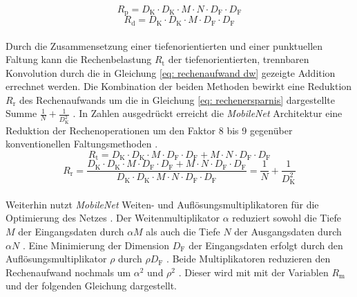 		\begin{equation}
			R_\text{p}=D_\text{K} \cdot D_\text{K} \cdot M \cdot N \cdot D_\text{F} \cdot D_\text{F}
			\label{eq: rechenaufwand}
		\end{equation}
		\begin{equation}
		R_\text{d}=D_\text{K} \cdot D_\text{K} \cdot M \cdot D_\text{F} \cdot D_\text{F}
		\label{eq: rechenaufwand t}
		\end{equation}\\
	
		Durch die Zusammensetzung einer tiefenorientierten und einer punktuellen Faltung kann die Rechenbelastung $R_\text{t}$ der tiefenorientierten, trennbaren Konvolution durch die in Gleichung \ref{eq: rechenaufwand dw} gezeigte Addition errechnet werden. Die Kombination der beiden Methoden bewirkt eine Reduktion $R_\text{r}$ des Rechenaufwands um die in Gleichung \ref{eq: rechenersparnis} dargestellte Summe $\frac{1}{N}+\frac{1}{D^2_\text{K}}$ \cite{mobilenets}. In Zahlen ausgedrückt erreicht die \textit{MobileNet} Architektur eine Reduktion der Rechenoperationen um den Faktor 8 bis 9 gegenüber konventionellen Faltungsmethoden \cite{mobilenets}.  \\
	
		\begin{equation}
			R_\text{t}=D_\text{K} \cdot D_\text{K} \cdot M \cdot D_\text{F} \cdot D_\text{F} + M \cdot N \cdot D_\text{F} \cdot D_\text{F}
			\label{eq: rechenaufwand dw}
		\end{equation}
		\begin{equation}
			R_\text{r}=\frac{D_\text{K} \cdot D_\text{K} \cdot M \cdot D_\text{F} \cdot D_\text{F} + M \cdot N \cdot D_\text{F} \cdot D_\text{F}}{D_\text{K} \cdot D_\text{K} \cdot M \cdot N \cdot D_\text{F} \cdot D_\text{F}}=\frac{1}{N}+\frac{1}{D^2_\text{K}}
			\label{eq: rechenersparnis}
		\end{equation}\\
		
		
		Weiterhin nutzt \textit{MobileNet} Weiten- und Auflösungsmultiplikatoren für die Optimierung des Netzes \cite{mobilenets}. Der Weitenmultiplikator $\alpha$ reduziert sowohl die Tiefe $M$ der Eingangsdaten durch $\alpha M$ als auch die Tiefe $N$ der Ausgangsdaten durch $\alpha N$ \cite{mobilenets}. Eine Minimierung der Dimension $D_\text{F}$ der Eingangsdaten erfolgt durch den Auflösungsmultiplikator $\rho$ durch $\rho D_\text{F}$ \cite{mobilenets}. Beide Multiplikatoren reduzieren den Rechenaufwand nochmals um $\alpha^2$ und $\rho^2$ \cite{mobilenets}. Dieser wird mit mit der Variablen $R_\text{m}$ und der folgenden Gleichung dargestellt. \\
		
